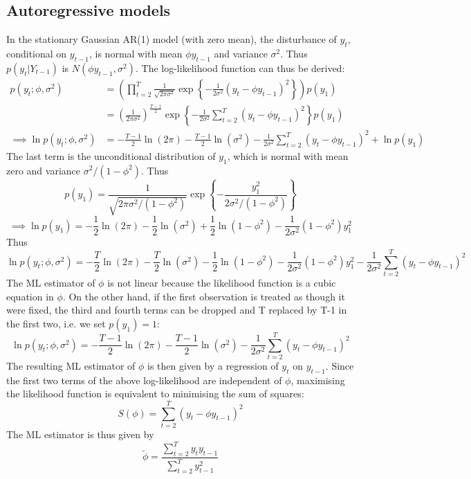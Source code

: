 \documentclass[DIV=14,titlepage=false]{scrreprt}
\begin{document}
\subsection{Autoregressive models}
In the stationary Gaussian AR(1) model (with zero mean), the disturbance of $y_t$, conditional on $y_{t-1}$, is normal with mean $\phi y_{t-1}$ and variance $\sigma^2$. Thus $p(y_t|Y_{t-1})$ is $N(\phi y_{t-1}, \sigma^2)$. The log-likelihood function can thus be derived:
\begin{align*}
p(y_t; \phi, \sigma^2) &= \left(\prod_{t=2}^{T} \frac{1}{\sqrt{2\pi \sigma^2}} \exp \left\{ -\frac{1}{2\sigma^2} (y_t - \phi y_{t-1})^2 \right\} \right)p(y_1)\\
&= \left( \frac{1}{2\pi \sigma^2} \right)^{\frac{T-1}{2}} \exp \left\{ -\frac{1}{2\sigma^2} \sum_{t=2}^{T} (y_t - \phi y_{t-1})^2 \right\} p(y_1) \\
\implies \ln p(y_t; \phi, \sigma^2) &= -\frac{T-1}{2} \ln (2\pi)-\frac{T-1}{2} \ln (\sigma^2) - \frac{1}{2\sigma^2} \sum_{t=2}^{T} (y_t - \phi y_{t-1})^2 + \ln p(y_1)
\end{align*}
The last term is the unconditional distribution of $y_1$, which is normal with mean zero and variance $\sigma^2/(1-\phi^2)$. Thus 
\[
    p(y_1) = \frac{1}{\sqrt{2\pi \sigma^2/(1-\phi^2)}} \exp \left\{ -\frac{y_1^2}{2\sigma^2/(1-\phi^2)}  \right\}
\]
\[
    \implies \ln p(y_1) = -\frac{1}{2} \ln (2\pi) - \frac{1}{2} \ln (\sigma^2) + \frac{1}{2}\ln(1-\phi^2) - \frac{1}{2\sigma^2}(1-\phi^2) y_1^2
\]
Thus
\[
    \ln p(y_t; \phi, \sigma^2) = - \frac{T}{2} \ln (2\pi) - \frac{T}{2} \ln (\sigma^2) - \frac{1}{2}\ln(1-\phi^2) - \frac{1}{2\sigma^2}(1-\phi^2) y_1^2 - \frac{1}{2\sigma^2} \sum_{t=2}^{T} (y_t - \phi y_{t-1})^2
\]
The ML estimator of $\phi$ is not linear because the likelihood function is a cubic equation in $\phi$. On the other hand, if the first observation is treated as though it were fixed, the third and fourth terms can be dropped and T replaced by T-1 in the first two, i.e. we set $p(y_1)=1$:
\[
    \ln p(y_t; \phi, \sigma^2) = - \frac{T-1}{2} \ln (2\pi) - \frac{T-1}{2} \ln (\sigma^2) - \frac{1}{2\sigma^2} \sum_{t=2}^{T} (y_t - \phi y_{t-1})^2
\]
The resulting ML estimator of $\phi$ is then given by a regression of $y_t$ on $y_{t-1}$. Since the first two terms of the above log-likelihood are independent of $\phi$, maximising the likelihood function is equivalent to minimising the sum of squares:
\[
    S(\phi) = \sum_{t=2}^{T} (y_t - \phi y_{t-1})^2
\]
The ML estimator is thus given by 
\[
    \tilde \phi = \frac{\sum_{t=2}^{T} y_t y_{t-1}}{\sum_{t=2}^{T} y_{t-1}^2}
\]
\end{document}
